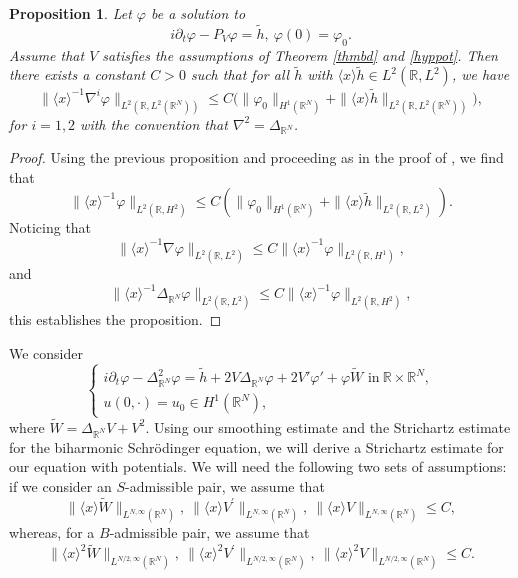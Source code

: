 \documentclass[10pt,leqno]{amsart}
\newtheorem{prop}{Proposition}[section]
\numberwithin{equation}{section}
\newcommand{\field}[1]{\mathbb{#1}}
\newcommand{\R}{\field{R}}          		%
\begin{document}
\begin{prop}
Let $\varphi$ be a solution to
$$i\partial_t \varphi- P_V \varphi = \tilde{h},\ \varphi(0)=\varphi_0.$$
Assume that $V$ satisfies the assumptions of Theorem \ref{thmbd} and \eqref{hyppot}. Then there exists a constant $C>0$ such that for all $\tilde{h}$ with $\langle x\rangle \tilde{h} \in L^2 (\R , L^2)$, we have
$$\big\|\langle x \rangle^{-1} \nabla^{i}\varphi\big\|_{L^2 (\R, L^2 (\R^N))} \leq C \big(\|\varphi_0\|_{H^1 (\R^N)} + \|\langle x\rangle  \tilde{h}\|_{L^2 (\R, L^{2}(\R^N))}  \big),$$
for $i=1,2$ with the convention that $\nabla^2 =\Delta_{\R^N}$.
\end{prop}

\begin{proof}
Using the previous proposition and proceeding as in the proof of \cite[Prop. 2.7]{BGT}, %
we find that
$$\|\langle x\rangle ^{-1} \varphi\|_{L^2 (\R, H^2)}\leq C (\|\varphi_0\|_{H^1 (\R^N)} +\|\langle x\rangle  \tilde{h}\|_{L^2 (\R, L^{2})}) .$$
Noticing that
$$\|\langle x\rangle ^{-1} \nabla \varphi\|_{L^2 (\R , L^2)}\leq C\|\langle x\rangle ^{-1} \varphi\|_{L^2 (\R , H^1)} ,$$
and
$$\|\langle x\rangle ^{-1} \Delta_{\R^N} \varphi\|_{L^2 (\R , L^2)}\leq C\|\langle x\rangle ^{-1} \varphi\|_{L^2 (\R , H^2)} ,$$
this establishes the proposition.

\end{proof}

We consider 
$$\begin{cases}
i\partial_t \varphi- \Delta_{\R^N}^2 \varphi = \tilde{h} + 2V\Delta_{\R^N} \varphi +2V' \varphi ' +\varphi \tilde{W}\mbox{ in}\ \R \times \R^N ,\\
u(0,\cdot)=u_0 \in H^1 (\R^N),
\end{cases}$$
where $\tilde{W}=\Delta_{\R^N} V +V^2$. Using our smoothing estimate and the Strichartz estimate for the biharmonic Schr\" odinger equation, we will derive a Strichartz estimate for our equation with potentials. We will need the following two sets of assumptions: if we consider an $S$-admissible pair, we assume that
\begin{equation}\label{V-conds-S}
\|\langle x\rangle \tilde{W}\|_{L^{N,\infty}(\R^N)},\  \|\langle x\rangle V^\prime\|_{L^{N,\infty}(\R^N)},\ \|\langle x\rangle V\|_{L^{N,\infty}(\R^N)}\leq C,
\end{equation}
whereas, for a $B$-admissible pair, we assume that
\begin{equation}\label{V-conds-B}
\|\langle x\rangle^2 \tilde{W}\|_{L^{N/2,\infty}(\R^N)},\  \|\langle x\rangle^2 V^\prime\|_{L^{N/2,\infty}(\R^N)},\ \|\langle x\rangle^2 V\|_{L^{N/2,\infty}(\R^N)}\leq C.
\end{equation}
\end{document}
